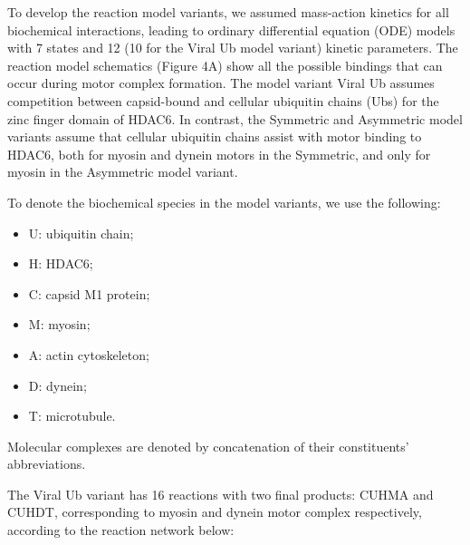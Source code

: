 To develop the reaction model variants, we assumed mass-action kinetics for all biochemical interactions, leading to ordinary differential equation (ODE) models with 7 states and 12 (10 for the Viral Ub model variant) kinetic parameters. The reaction model schematics (Figure 4A) show all the possible bindings that can occur during motor complex formation. The model variant Viral Ub assumes competition between capsid-bound and cellular ubiquitin chains (Ubs) for the zinc finger domain of HDAC6. In contrast, the Symmetric and Asymmetric model variants assume that cellular ubiquitin chains assist with motor binding to HDAC6, both for myosin and dynein motors in the Symmetric, and only for myosin in the Asymmetric model variant.

To denote the biochemical species in the model variants, we use the following:

\begin{itemize}
\item U: ubiquitin chain;
\item H: HDAC6;
\item C: capsid M1 protein;
\item M: myosin;
\item A: actin cytoskeleton;
\item D: dynein;
\item T: microtubule.
\end{itemize}

Molecular complexes are denoted by concatenation of their constituents’ abbreviations.

The Viral Ub variant has 16 reactions with two final products: CUHMA and CUHDT, corresponding to myosin and dynein motor complex respectively, according to the reaction network below:

